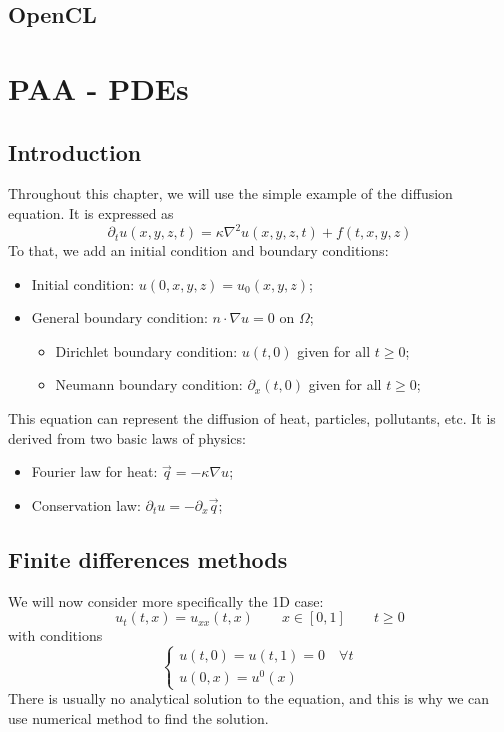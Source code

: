 \documentclass[12pt, openany]{report}
\theoremstyle{definition}
\begin{document}
\section{OpenCL}
\chapter{PAA - PDEs}
\section{Introduction}
Throughout this chapter, we will use the simple example of the diffusion equation. It is expressed as 
\begin{equation}
	\partial_t u(x,y,z,t) = \kappa \nabla^2 u(x,y,z,t) + f(t,x,y,z)
\end{equation}
To that, we add an initial condition and boundary conditions:
\begin{itemize}
	\item Initial condition: $u(0,x,y,z) = u_0(x,y,z)$;
	\item General boundary condition: $ n\cdot \nabla u=0$ on $\Omega$;
	\begin{itemize}
		\item Dirichlet boundary condition: $u(t,0)$ given for all $t\ge0$;
		\item Neumann boundary condition: $\partial_x(t,0)$ given for all $t\ge0$;
	\end{itemize}
\end{itemize}
This equation can represent the diffusion of heat, particles, pollutants, etc. It is derived from two basic laws of physics:
\begin{itemize}
	\item Fourier law for heat: $\vec q=-\kappa \nabla u$;
	\item Conservation law: $\partial_t u = -\partial_x \vec q$;
\end{itemize}
\section{Finite differences methods}
We will now consider more specifically the 1D case:
\begin{equation}
	u_t(t,x)=u_{xx}(t,x) \qquad x\in [0,1]\qquad t\ge 0
\end{equation}
with conditions 
\begin{equation}
	\begin{cases}
		u(t,0)=u(t,1) = 0 \quad \forall t\\
		u(0,x) = u^0(x)
	\end{cases}
\end{equation}
There is usually no analytical solution to the equation, and this is why we can use numerical method to find the solution. 
\end{document}

